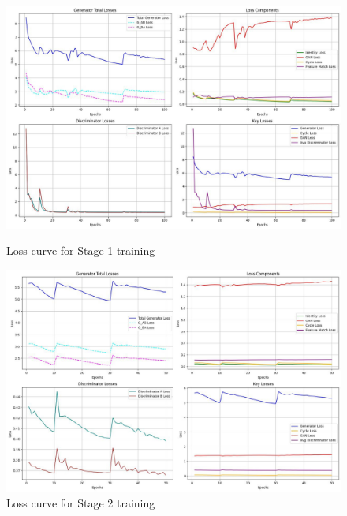 \documentclass[twoside,english,notitlepage]{report}
\begin{document}
\begin{figure}[h]
    \centering
    \includegraphics[width=\textwidth]{task1/stage1_loss.jpg}
    \vspace{-10pt}
    \caption{Loss curve for Stage 1 training}
    \vspace{12pt}
    \includegraphics[width=\linewidth]{task1/stage2_loss.jpg}
    \vspace{-10pt}
    \caption{Loss curve for Stage 2 training}
    \vspace{12pt}
\end{figure}
\end{document}
